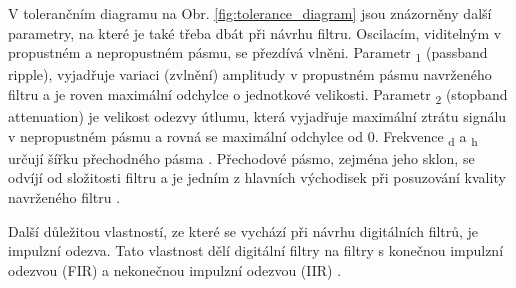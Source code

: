 V tolerančním diagramu na Obr. \ref{fig:tolerance_diagram} jsou znázorněny další
parametry, na které je také třeba dbát při návrhu filtru. Oscilacím, viditelným
v propustném a nepropustném pásmu, se přezdívá vlněni. Parametr \textdelta
\textsubscript{1} (passband ripple), vyjadřuje variaci (zvlnění) amplitudy v
propustném pásmu navrženého filtru a je roven maximální odchylce o jednotkové
velikosti. Parametr \textdelta \textsubscript{2} (stopband attenuation) je
velikost odezvy útlumu, která vyjadřuje maximální ztrátu signálu v nepropustném
pásmu a rovná se maximální odchylce od 0. Frekvence \textomega \textsubscript{d}
a \textomega \textsubscript{h} určují šířku přechodného pásma
\cite{Prchal2000,Lyons1997}. Přechodové pásmo, zejména jeho sklon, se odvíjí od
složitosti filtru a je jedním z hlavních východisek při posuzování kvality
navrženého filtru \cite{Jan2002}.

Další důležitou vlastností, ze které se vychází při návrhu digitálních filtrů,
je impulzní odezva. Tato vlastnost dělí digitální filtry na filtry s konečnou
impulzní odezvou (FIR) a nekonečnou impulzní odezvou (IIR) \cite{Skop1994}.

